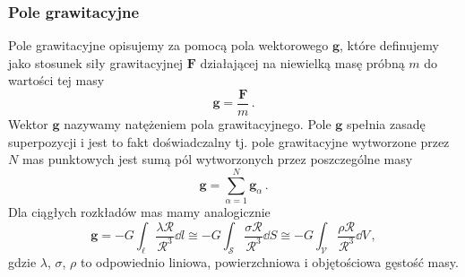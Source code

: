 \documentclass[../main.tex]{subfiles}
\begin{document}
\subsubsection{Pole grawitacyjne}
Pole grawitacyjne opisujemy za pomocą pola wektorowego \(\mathbf{g}\), które definujemy jako
stosunek siły grawitacyjnej \(\mathbf{F}\) działającej na niewielką masę próbną \(m\) do wartości
tej masy
\begin{equation*}
    \mathbf{g}=\frac{\mathbf{F}}{m}\,.
\end{equation*}
Wektor \(\mathbf{g}\) nazywamy natężeniem pola grawitacyjnego. Pole \(\mathbf{g}\) spełnia zasadę
superpozycji i jest to fakt doświadczalny tj. pole grawitacyjne wytworzone przez \(N\) mas
punktowych jest sumą pól wytworzonych przez poszczególne masy
\begin{equation*}
    \mathbf{g}=\sum_{\alpha=1}^N\mathbf{g}_\alpha \,.
\end{equation*}
Dla ciągłych rozkładów mas mamy analogicznie
\begin{equation*}
    \mathbf{g}=-G\int_\ell \frac{\lambda \boldsymbol{\mathcal{R}}}{\mathcal{R}^3}\dd{l}\cong -G\int_\mathcal{S} \frac{\sigma \boldsymbol{{\mathcal{R}}}}{\mathcal{R}^3}\dd{S}\cong -G\int_\mathcal{V} \frac{\rho \boldsymbol{{\mathcal{R}}}}{\mathcal{R}^3}\dd{V}\,,
\end{equation*}
gdzie \(\lambda\), \(\sigma\), \(\rho\) to odpowiednio liniowa, powierzchniowa i objętościowa
gęstość masy.
\end{document}
